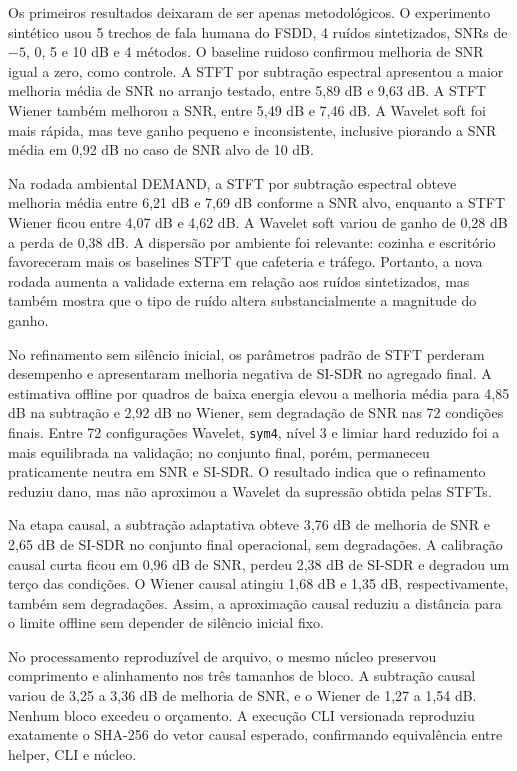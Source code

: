Os primeiros resultados deixaram de ser apenas metodológicos. O experimento sintético usou 5 trechos de fala humana do FSDD, 4 ruídos sintetizados, SNRs de \(-5\), 0, 5 e 10 dB e 4 métodos. O baseline ruidoso confirmou melhoria de SNR igual a zero, como controle. A STFT por subtração espectral apresentou a maior melhoria média de SNR no arranjo testado, entre 5,89 dB e 9,63 dB. A STFT Wiener também melhorou a SNR, entre 5,49 dB e 7,46 dB. A Wavelet soft foi mais rápida, mas teve ganho pequeno e inconsistente, inclusive piorando a SNR média em 0,92 dB no caso de SNR alvo de 10 dB.

Na rodada ambiental DEMAND, a STFT por subtração espectral obteve melhoria média entre 6,21 dB e 7,69 dB conforme a SNR alvo, enquanto a STFT Wiener ficou entre 4,07 dB e 4,62 dB. A Wavelet soft variou de ganho de 0,28 dB a perda de 0,38 dB. A dispersão por ambiente foi relevante: cozinha e escritório favoreceram mais os baselines STFT que cafeteria e tráfego. Portanto, a nova rodada aumenta a validade externa em relação aos ruídos sintetizados, mas também mostra que o tipo de ruído altera substancialmente a magnitude do ganho.

No refinamento sem silêncio inicial, os parâmetros padrão de STFT perderam desempenho e apresentaram melhoria negativa de SI-SDR no agregado final. A estimativa offline por quadros de baixa energia elevou a melhoria média para 4,85 dB na subtração e 2,92 dB no Wiener, sem degradação de SNR nas 72 condições finais. Entre 72 configurações Wavelet, \texttt{sym4}, nível 3 e limiar hard reduzido foi a mais equilibrada na validação; no conjunto final, porém, permaneceu praticamente neutra em SNR e SI-SDR. O resultado indica que o refinamento reduziu dano, mas não aproximou a Wavelet da supressão obtida pelas STFTs.

Na etapa causal, a subtração adaptativa obteve 3,76 dB de melhoria de SNR e 2,65 dB de SI-SDR no conjunto final operacional, sem degradações. A calibração causal curta ficou em 0,96 dB de SNR, perdeu 2,38 dB de SI-SDR e degradou um terço das condições. O Wiener causal atingiu 1,68 dB e 1,35 dB, respectivamente, também sem degradações. Assim, a aproximação causal reduziu a distância para o limite offline sem depender de silêncio inicial fixo.

No processamento reproduzível de arquivo, o mesmo núcleo preservou comprimento e alinhamento nos três tamanhos de bloco. A subtração causal variou de 3,25 a 3,36 dB de melhoria de SNR, e o Wiener de 1,27 a 1,54 dB. Nenhum bloco excedeu o orçamento. A execução CLI versionada reproduziu exatamente o SHA-256 do vetor causal esperado, confirmando equivalência entre helper, CLI e núcleo.

